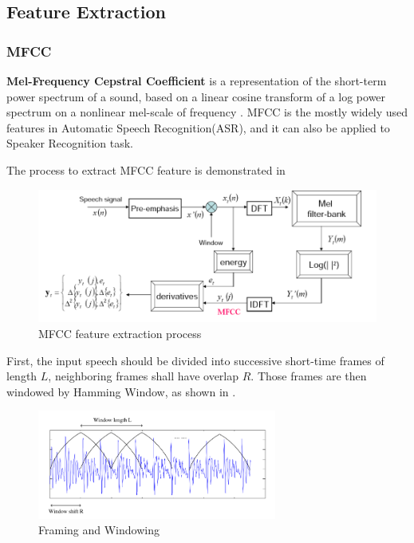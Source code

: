 
\subsection{Feature Extraction}

\subsubsection{MFCC}
\label{sec:mfcc}
\textbf{Mel-Frequency Cepstral Coefficient} is a representation of the short-term power spectrum of a sound,
based on a linear cosine transform of a log power spectrum on a nonlinear mel-scale of frequency \cite{mfcc} .
MFCC is the mostly widely used features in Automatic Speech Recognition(ASR), and it can also be applied to Speaker Recognition task.


The process to extract MFCC feature is demonstrated in 
\begin{figure}

  \centering
  \includegraphics[width=\textwidth]{img/MFCC.png}
  \caption{MFCC feature extraction process\label{fig:mfcc}}

\end{figure}

First, the input speech should be divided into successive short-time frames of length $L$,
neighboring frames shall have overlap $R$.
Those frames are then windowed by Hamming Window, as shown in .
\begin{figure}
  \centering
  \includegraphics[width=0.7\textwidth]{img/MFCC-windowing-frames.png}
  \caption{Framing and Windowing \label{fig:framming}}
\end{figure}

